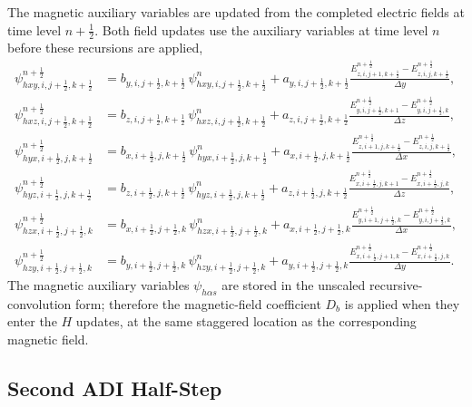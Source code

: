 \documentclass{article}
\numberwithin{equation}{section}
\numberwithin{figure}{section}
\begin{document}
The magnetic auxiliary variables are updated from the completed electric fields at time level $n+\tfrac12$. Both field updates use the auxiliary variables at time level $n$ before these recursions are applied,
\begin{subequations}\label{eq:first-pml-aux-h}
    \begin{align}
        \psi_{hxy,i,j+\tfrac12,k+\tfrac12}^{n+\frac12} & = b_{y,i,j+\tfrac12,k+\tfrac12}\,\psi_{hxy,i,j+\tfrac12,k+\tfrac12}^{n} +a_{y,i,j+\tfrac12,k+\tfrac12} \frac{E_{z,i,j+1,k+\tfrac12}^{n+\frac12}-E_{z,i,j,k+\tfrac12}^{n+\frac12}}{\Delta y}, \\
        \psi_{hxz,i,j+\tfrac12,k+\tfrac12}^{n+\frac12} & = b_{z,i,j+\tfrac12,k+\tfrac12}\,\psi_{hxz,i,j+\tfrac12,k+\tfrac12}^{n} +a_{z,i,j+\tfrac12,k+\tfrac12} \frac{E_{y,i,j+\tfrac12,k+1}^{n+\frac12}-E_{y,i,j+\tfrac12,k}^{n+\frac12}}{\Delta z}, \\
        \psi_{hyx,i+\tfrac12,j,k+\tfrac12}^{n+\frac12} & = b_{x,i+\tfrac12,j,k+\tfrac12}\,\psi_{hyx,i+\tfrac12,j,k+\tfrac12}^{n} +a_{x,i+\tfrac12,j,k+\tfrac12} \frac{E_{z,i+1,j,k+\tfrac12}^{n+\frac12}-E_{z,i,j,k+\tfrac12}^{n+\frac12}}{\Delta x}, \\
        \psi_{hyz,i+\tfrac12,j,k+\tfrac12}^{n+\frac12} & = b_{z,i+\tfrac12,j,k+\tfrac12}\,\psi_{hyz,i+\tfrac12,j,k+\tfrac12}^{n} +a_{z,i+\tfrac12,j,k+\tfrac12} \frac{E_{x,i+\tfrac12,j,k+1}^{n+\frac12}-E_{x,i+\tfrac12,j,k}^{n+\frac12}}{\Delta z}, \\
        \psi_{hzx,i+\tfrac12,j+\tfrac12,k}^{n+\frac12} & = b_{x,i+\tfrac12,j+\tfrac12,k}\,\psi_{hzx,i+\tfrac12,j+\tfrac12,k}^{n} +a_{x,i+\tfrac12,j+\tfrac12,k} \frac{E_{y,i+1,j+\tfrac12,k}^{n+\frac12}-E_{y,i,j+\tfrac12,k}^{n+\frac12}}{\Delta x}, \\
        \psi_{hzy,i+\tfrac12,j+\tfrac12,k}^{n+\frac12} & = b_{y,i+\tfrac12,j+\tfrac12,k}\,\psi_{hzy,i+\tfrac12,j+\tfrac12,k}^{n} +a_{y,i+\tfrac12,j+\tfrac12,k} \frac{E_{x,i+\tfrac12,j+1,k}^{n+\frac12}-E_{x,i+\tfrac12,j,k}^{n+\frac12}}{\Delta y}.
    \end{align}
\end{subequations}
The magnetic auxiliary variables $\psi_{h\alpha s}$ are stored in the unscaled recursive-convolution form; therefore the magnetic-field coefficient $D_b$ is applied when they enter the $H$ updates, at the same staggered location as the corresponding magnetic field.

\subsection{Second ADI Half-Step}
\end{document}
